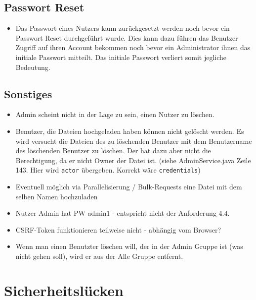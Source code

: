 \documentclass[12pt,DIV14,BCOR10mm,a4paper,parskip=half-,headsepline,headinclude,english,ngerman,bibliography=totocnumbered]{scrreprt}
\begin{document}
 \section{Passwort Reset}
\begin{itemize}
 \item Das Passwort eines Nutzers kann zurückgesetzt werden noch bevor ein Passwort Reset durchgeführt wurde. Dies kann dazu führen das Benutzer Zugriff auf ihren Account bekommen noch bevor ein Administrator ihnen das initiale Passwort mitteilt. Das initiale Passwort verliert somit jegliche Bedeutung.
 \end{itemize}

\section{Sonstiges}

\begin{itemize} 
  
  \item Admin scheint nicht in der Lage zu sein, einen Nutzer zu löschen.

  
  \item Benutzer, die Dateien hochgeladen haben können nicht gelöscht werden. Es wird versucht die Dateien des zu löschenden Benutzer mit dem Benutzername des löschenden Benutzer zu löschen. Der hat dazu aber nicht die Berechtigung, da er nicht Owner der Datei ist. (siehe AdminService.java Zeile 143. Hier wird \texttt{actor} übergeben. Korrekt wäre \texttt{credentials})
  \item Eventuell möglich via Parallelisierung / Bulk-Requests eine Datei mit dem selben Namen hochzuladen
  \item Nutzer Admin hat PW admin1 - entspricht nicht der Anforderung 4.4.
  \item CSRF-Token funktionieren teilweise nicht - abhängig vom Browser?
  \item Wenn man einen Benutzter löschen will, der in der Admin Gruppe ist (was nicht gehen soll), wird er aus der Alle Gruppe entfernt.
\end{itemize}

\chapter{Sicherheitslücken}
\end{document}
